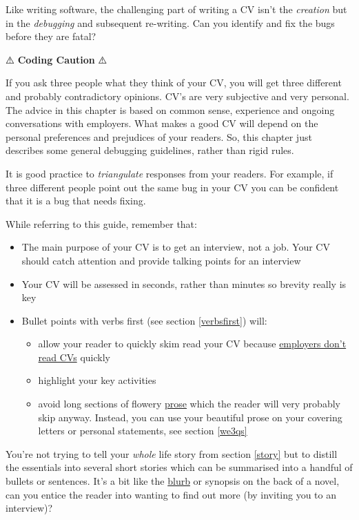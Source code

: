 \documentclass[
]{book}
\providecommand{\tightlist}{%
  \setlength{\itemsep}{0pt}\setlength{\parskip}{0pt}}
\begin{document}
Like writing software, the challenging part of writing a CV isn't the \emph{creation} but in the \emph{debugging} and subsequent re-writing. Can you identify and fix the bugs before they are fatal?

⚠️ \textbf{Coding Caution} ⚠️

If you ask three people what they think of your CV, you will get three different and probably contradictory opinions. CV's are very subjective and very personal. The advice in this chapter is based on common sense, experience and ongoing conversations with employers. What makes a good CV will depend on the personal preferences and prejudices of your readers. So, this chapter just describes some general debugging guidelines, rather than rigid rules.

It is good practice to \emph{triangulate} responses from your readers. For example, if three different people point out the same bug in your CV you can be confident that it is a bug that needs fixing.

While referring to this guide, remember that:

\begin{itemize}
\tightlist
\item
  The main purpose of your CV is to get an interview, not a job. Your CV should catch attention and provide talking points for an interview
\item
  Your CV will be assessed in seconds, rather than minutes so brevity really is key
\item
  Bullet points with verbs first (see section \ref{verbsfirst}) will:

  \begin{itemize}
  \tightlist
  \item
    allow your reader to quickly skim read your CV because \href{https://readabilityguidelines.co.uk/content-design/how-people-read/}{employers don't read CVs} quickly \citep{scanning}
  \item
    highlight your key activities
  \item
    avoid long sections of flowery \href{https://en.wikipedia.org/wiki/Prose}{prose} which the reader will very probably skip anyway. Instead, you can use your beautiful prose on your covering letters or personal statements, see section \ref{we3qs}
  \end{itemize}
\end{itemize}

You're not trying to tell your \emph{whole} life story from section \ref{story} but to distill the essentials into several short stories which can be summarised into a handful of bullets or sentences. It's a bit like the \href{https://en.wikipedia.org/wiki/Blurb}{blurb} or synopsis on the back of a novel, can you entice the reader into wanting to find out more (by inviting you to an interview)?
\end{document}
